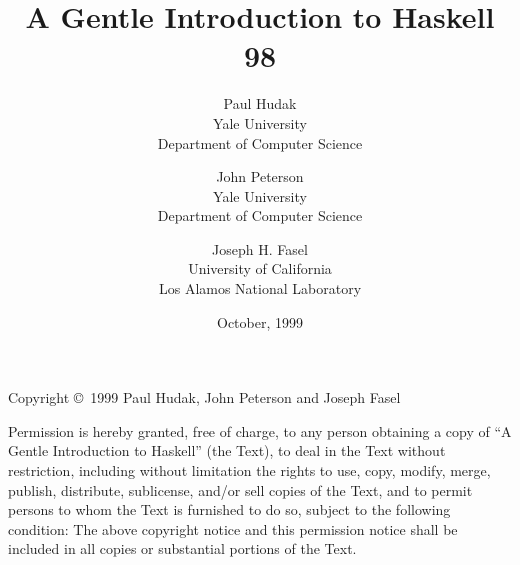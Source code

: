 \documentclass[11pt]{article}
\begin{document}
\title{A Gentle Introduction to Haskell 98}
\author{Paul Hudak\\
Yale University\\
Department of Computer Science  
\and
John Peterson\\
Yale University\\
Department of Computer Science  
\and
Joseph H. Fasel\\
University of California\\
Los Alamos National Laboratory}
\date{October, 1999}

\maketitle

Copyright \copyright\ 1999 Paul Hudak, John Peterson and Joseph Fasel

     Permission is hereby granted, free of charge, to any person obtaining
     a copy of ``A Gentle Introduction to Haskell'' (the Text), to deal
     in the Text without restriction, including without limitation the
     rights to use, copy, modify, merge, publish, distribute, sublicense,
     and/or sell copies of the Text, and to permit persons to whom the
     Text is furnished to do so, subject to the following condition:
     The above copyright notice and this permission notice shall be
     included in all copies or substantial portions of the Text.

\newpage


















\end{document}

